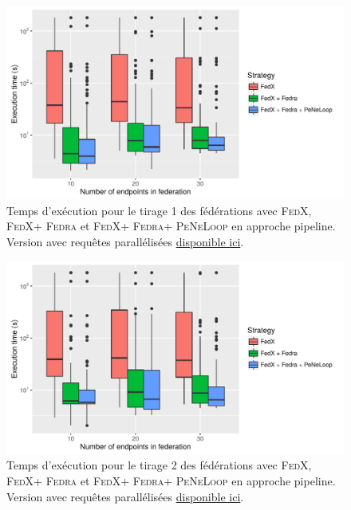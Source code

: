 \documentclass[a4paper]{article}
\def\fedra{\textsc{Fedra}\xspace}
\def\fedx{\textsc{FedX}\xspace}
\def\peneloop{\textsc{PeNeLoop}\xspace}
\newcommand{\parallelLink}[1]{Version avec requêtes parallélisées \href{#1}{disponible ici}.}
\begin{document}
\begin{figure}[h]
    \centering
    \includegraphics{boxplots/fed1_execution_time.pdf}
    \caption{Temps d'exécution pour le tirage 1 des fédérations avec \fedx, \fedx + \fedra et \fedx + \fedra + \peneloop en approche pipeline. \parallelLink{https://github.com/Callidon/ParallelNestedLoop/blob/master/results/definitive/fed1_pll_execution_time.pdf}}
    \label{fig:fed1_time}
\end{figure}

\begin{figure}[h]
    \centering
    \includegraphics{boxplots/fed2_execution_time.pdf}
    \caption{Temps d'exécution pour le tirage 2 des fédérations avec \fedx, \fedx + \fedra et \fedx + \fedra + \peneloop en approche pipeline. \parallelLink{https://github.com/Callidon/ParallelNestedLoop/blob/master/results/definitive/fed2_pll_execution_time.pdf}}
    \label{fig:fed2_time}
\end{figure}
\end{document}
